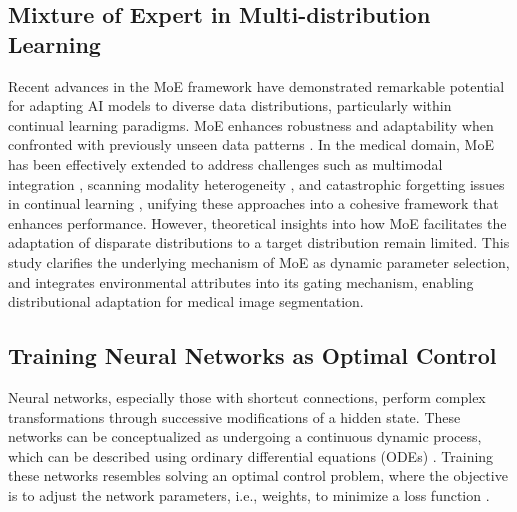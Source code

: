 \subsection{Mixture of Expert in Multi-distribution Learning}
Recent advances in the MoE framework \cite{shazeer2017outrageously} have demonstrated remarkable potential for adapting AI models to diverse data distributions, particularly within continual learning paradigms. MoE enhances robustness and adaptability when confronted with previously unseen data patterns \cite{rypesc2024divide, yu2024boosting}. In the medical domain, MoE has been effectively extended to address challenges such as multimodal integration \cite{jiang2024m4oe}, scanning modality heterogeneity \cite{zhang2024foundation}, and catastrophic forgetting issues in continual learning \cite{chen2024low, wang2024sam}, unifying these approaches into a cohesive framework that enhances performance. However, theoretical insights into how MoE facilitates the adaptation of disparate distributions to a target distribution remain limited. {This study clarifies the underlying mechanism of MoE as dynamic parameter selection,  and integrates environmental attributes into its gating mechanism, enabling distributional adaptation for medical image segmentation. }

\subsection{Training Neural Networks as Optimal Control}
Neural networks, especially those with shortcut connections, perform complex transformations through successive modifications of a hidden state. These networks can be conceptualized as undergoing a continuous dynamic process, which can be described using ordinary differential equations (ODEs) \cite{weinan2017proposal, lu2018beyond}. Training these networks resembles solving an optimal control problem, where the objective is to adjust the network parameters, i.e., weights, to minimize a loss function \cite{chen2018neural, sun2024layer}. %

